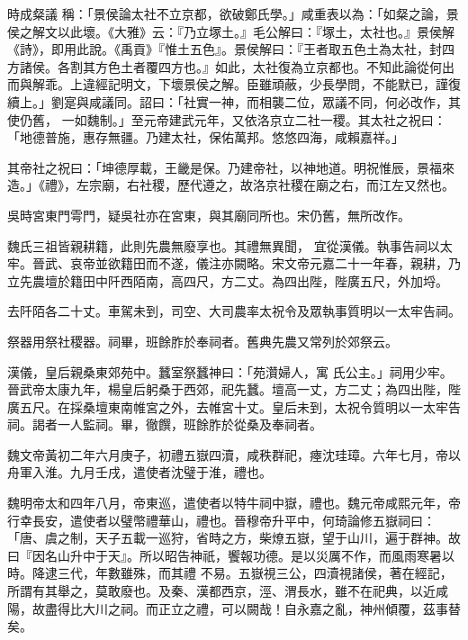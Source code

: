 \begin{pinyinscope}
 時成粲議
 稱：「景侯論太社不立京都，欲破鄭氏學。」咸重表以為：「如粲之論，景侯之解文以此壞。《大雅》云：『乃立塚土。』毛公解曰：『塚土，太社也。』景侯解《詩》，即用此說。《禹貢》『惟土五色』。景侯解曰：『王者取五色土為太社，封四方諸侯。各割其方色土者覆四方也。』如此，太社復為立京都也。不知此論從何出而與解乖。上違經記明文，下壞景侯之解。臣雖頑蔽，少長學問，不能默已，謹復續上。」劉寔與咸議同。詔曰：「社實一神，而相襲二位，眾議不同，何必改作，其使仍舊，
 一如魏制。」至元帝建武元年，又依洛京立二社一稷。其太社之祝曰：「地德普施，惠存無疆。乃建太社，保佑萬邦。悠悠四海，咸賴嘉祥。」



 其帝社之祝曰：「坤德厚載，王畿是保。乃建帝社，以神地道。明祝惟辰，景福來造。」《禮》，左宗廟，右社稷，歷代遵之，故洛京社稷在廟之右，而江左又然也。



 吳時宮東門雩門，疑吳社亦在宮東，與其廟同所也。宋仍舊，無所改作。



 魏氏三祖皆親耕籍，此則先農無廢享也。其禮無異聞，
 宜從漢儀。執事告祠以太牢。晉武、哀帝並欲籍田而不遂，儀注亦闕略。宋文帝元嘉二十一年春，親耕，乃立先農壇於籍田中阡西陌南，高四尺，方二丈。為四出陛，陛廣五尺，外加埒。



 去阡陌各二十丈。車駕未到，司空、大司農率太祝令及眾執事質明以一太牢告祠。



 祭器用祭社稷器。祠畢，班餘胙於奉祠者。舊典先農又常列於郊祭云。



 漢儀，皇后親桑東郊苑中。蠶室祭蠶神曰：「苑灒婦人，寓
 氏公主。」祠用少牢。晉武帝太康九年，楊皇后躬桑于西郊，祀先蠶。壇高一丈，方二丈；為四出陛，陛廣五尺。在採桑壇東南帷宮之外，去帷宮十丈。皇后未到，太祝令質明以一太牢告祠。謁者一人監祠。畢，徹饌，班餘胙於從桑及奉祠者。



 魏文帝黃初二年六月庚子，初禮五嶽四瀆，咸秩群祀，瘞沈珪璋。六年七月，帝以舟軍入淮。九月壬戌，遣使者沈璧于淮，禮也。



 魏明帝太和四年八月，帝東巡，遣使者以特牛祠中嶽，禮也。魏元帝咸熙元年，帝行幸長安，遣使者以璧幣禮華山，禮也。晉穆帝升平中，何琦論修五嶽祠曰：「唐、虞之制，天子五載一巡狩，省時之方，柴燎五嶽，望于山川，遍于群神。故曰『因名山升中于天』。所以昭告神祇，饗報功德。是以災厲不作，而風雨寒暑以時。降逮三代，年數雖殊，而其禮
 不易。五嶽視三公，四瀆視諸侯，著在經記，所謂有其舉之，莫敢廢也。及秦、漢都西京，涇、渭長水，雖不在祀典，以近咸陽，故盡得比大川之祠。而正立之禮，可以闕哉！自永嘉之亂，神州傾覆，茲事替矣。




\end{pinyinscope}
